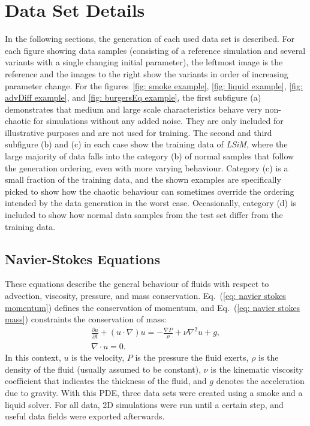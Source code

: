 \section{Data Set Details} \label{append: data sets}
In the following sections, the generation of each used data set is described. For each figure showing data samples (consisting of a reference simulation and several variants with a single changing initial parameter), the leftmost image is the reference and the images to the right show the variants in order of increasing parameter change. For the figures~\ref{fig: smoke example}, \ref{fig: liquid example}, \ref{fig: advDiff example}, and \ref{fig: burgersEq example}, the first subfigure (a) demonstrates that medium and large scale characteristics behave very non-chaotic for simulations without any added noise. They are only included for illustrative purposes and are not used for training. The second and third subfigure (b) and (c) in each case show the training data of \textit{LSiM}, where the large majority of data falls into the category (b) of normal samples that follow the generation ordering, even with more varying behaviour. Category (c) is a small fraction of the training data, and the shown examples are specifically picked to show how the chaotic behaviour can sometimes override the ordering intended by the data generation in the worst case. Occasionally, category (d) is included to show how normal data samples from the test set differ from the training data.


\subsection{Navier-Stokes Equations}
These equations describe the general behaviour of fluids with respect to advection, viscosity, pressure, and mass conservation. Eq.~(\ref{eq: navier stokes momentum}) defines the conservation of momentum, and Eq.~(\ref{eq: navier stokes mass}) constraints the conservation of mass: 
\begin{gather}
\frac{\partial u}{\partial t} + (u \cdot \nabla) u = - \frac{\nabla P}{\rho} + \nu \nabla^2 u + g,
\label{eq: navier stokes momentum}
\\
\nabla \cdot u = 0.
\label{eq: navier stokes mass}
\end{gather}
In this context, $u$ is the velocity, $P$ is the pressure the fluid exerts, $\rho$ is the density of the fluid (usually assumed to be constant), $\nu$ is the kinematic viscosity coefficient that indicates the thickness of the fluid, and $g$ denotes the acceleration due to gravity. With this PDE, three data sets were created using a smoke and a liquid solver. For all data, 2D simulations were run until a certain step, and useful data fields were exported afterwards.

